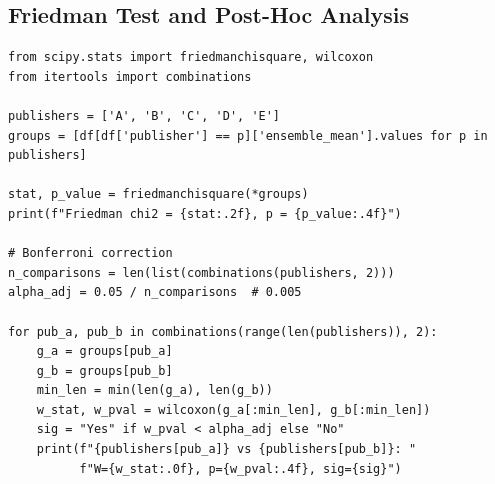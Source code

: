 \documentclass[10pt,letterpaper]{article}
\begin{document}
\subsection*{Friedman Test and Post-Hoc Analysis}

\begin{lstlisting}[caption={Friedman test and Bonferroni-corrected Wilcoxon
  post-hoc tests.}, label={lst:friedman}]
from scipy.stats import friedmanchisquare, wilcoxon
from itertools import combinations

publishers = ['A', 'B', 'C', 'D', 'E']
groups = [df[df['publisher'] == p]['ensemble_mean'].values for p in publishers]

stat, p_value = friedmanchisquare(*groups)
print(f"Friedman chi2 = {stat:.2f}, p = {p_value:.4f}")

# Bonferroni correction
n_comparisons = len(list(combinations(publishers, 2)))
alpha_adj = 0.05 / n_comparisons  # 0.005

for pub_a, pub_b in combinations(range(len(publishers)), 2):
    g_a = groups[pub_a]
    g_b = groups[pub_b]
    min_len = min(len(g_a), len(g_b))
    w_stat, w_pval = wilcoxon(g_a[:min_len], g_b[:min_len])
    sig = "Yes" if w_pval < alpha_adj else "No"
    print(f"{publishers[pub_a]} vs {publishers[pub_b]}: "
          f"W={w_stat:.0f}, p={w_pval:.4f}, sig={sig}")
\end{lstlisting}
\end{document}
